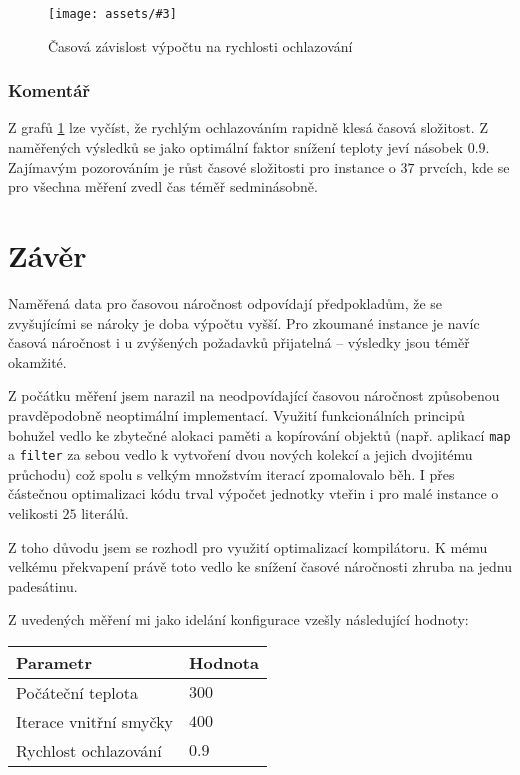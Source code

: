 \documentclass[czech]{article}
\newcommand{\image}[3]{
    \begin{figure}[H]
        \centering
        \texttt{[image: assets/\#3]}
        \caption{#2}
        \label{fig:#1}
    \end{figure}
}
\begin{document}
\image{annealing-factor}{Časová závislost výpočtu na rychlosti ochlazování}{annealing-factor.png}

\subsubsection*{Komentář}

Z grafů \ref{fig:annealing-factor} lze vyčíst, že rychlým ochlazováním rapidně klesá časová složitost.
Z naměřených výsledků se jako optimální faktor snížení teploty jeví násobek $0.9$.
Zajímavým pozorováním je růst časové složitosti pro instance o $37$ prvcích, kde se pro všechna měření zvedl čas téměř sedminásobně.

\section{Závěr}

Naměřená data pro časovou náročnost odpovídají předpokladům, že se zvyšujícími se nároky je doba výpočtu vyšší.
Pro zkoumané instance je navíc časová náročnost i u zvýšených požadavků přijatelná -- výsledky jsou téměř okamžité.

Z počátku měření jsem narazil na neodpovídající časovou náročnost způsobenou pravděpodobně neoptimální implementací.
Využití funkcionálních principů bohužel vedlo ke zbytečné alokaci paměti a kopírování objektů (např. aplikací \texttt{map} a \texttt{filter} za sebou vedlo k vytvoření dvou nových kolekcí a jejich dvojitému průchodu) což spolu s velkým množstvím iterací zpomalovalo běh.
I přes částečnou optimalizaci kódu trval výpočet jednotky vteřin i pro malé instance o velikosti $25$ literálů.

Z toho důvodu jsem se rozhodl pro využití optimalizací kompilátoru.
K mému velkému překvapení právě toto vedlo ke snížení časové náročnosti zhruba na jednu padesátinu.

Z uvedených měření mi jako idelání konfigurace vzešly následující hodnoty: \\

\begin{tabular}{ | l | l | }
    \hline
    Parametr & Hodnota \\ \hline \hline
    Počáteční teplota & $300$ \\
    Iterace vnitřní smyčky & $400$ \\
    Rychlost ochlazování & $0.9$ \\ \hline
\end{tabular}



\end{document}
